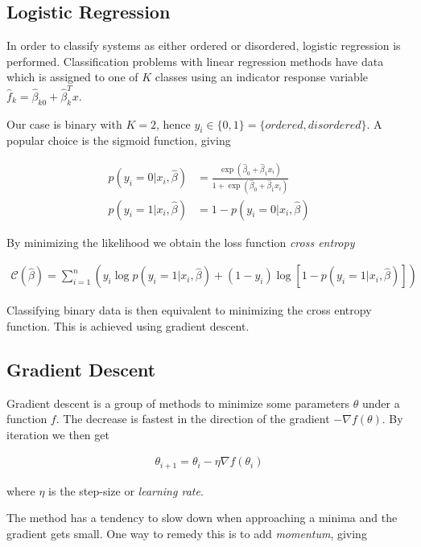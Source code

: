 \subsection{Logistic Regression}

In order to classify systems as either ordered or disordered, logistic
regression is performed. Classification problems with linear regression methods have data which is assigned to
one of \(K\) classes using an indicator response variable \(\hat f_{k}= \hat
\beta_{k0} + \hat\beta_{k}^{T}x\). 

Our case is binary with \(K=2\), hence \(y_{i} \in \{0,
1\} = \{ordered, disordered\}\). A popular choice is the sigmoid function,
giving

\begin{align*}
  p(y_{i} = 0 | x_{i},\hat\beta)  &= \frac{\exp(\hat{\beta}_{0} + 
                                    \hat\beta_{1}x_{i})}{1 + \exp(\hat\beta_{0} + \hat\beta_{1}x_{i})}\\
  p(y_{i} = 1 | x_{i},\hat\beta) &= 1 - p(y_i = 0 | x_{i},\hat\beta)
\end{align*}

By minimizing the likelihood we obtain the loss function \textit{cross entropy}~\cite{statelem}

\begin{align*}
  \mathcal{C}(\hat\beta) = \sum_{i=1}^{n}\left( y_{i}\log{p(y_{i}=1|x_{i},\hat\beta)} +
  (1-y_{i})\log{\left[ 1-p(y_{i}=1|x_{i},\hat\beta) \right]}\right)
\end{align*}

Classifying binary data is then equivalent to minimizing the cross entropy
function. This is achieved using gradient descent.

\subsection{Gradient Descent}

Gradient descent is a group of methods to minimize some parameters \(\theta\)
under a function \(f\).
The decrease is fastest in the direction of the gradient \(-\nabla f(\theta)\). By
iteration we then get

\begin{align*}
  \theta_{i+1} = \theta_{i} - \eta\nabla f(\theta_{i})
\end{align*}

where \(\eta\) is the step-size or \textit{learning rate}.

The method has a tendency to slow down when approaching a minima and the
gradient gets small. One way to remedy this is to add \textit{momentum}, giving

